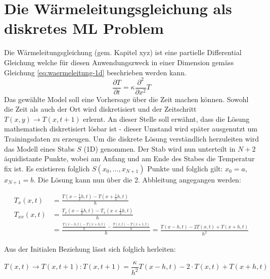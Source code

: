 	\section{Die Wärmeleitungsgleichung als diskretes ML Problem}
	Die Wärmeleitungsgleichung (gem. Kapitel xyz) ist eine partielle Differential Gleichung welche für diesen Anwendungszweck in einer Dimension gemäss Gleichung \ref{eq:waermeleitung-1d} beschrieben werden kann.
	\begin{equation}
	\frac{\partial T}{\partial t} = \kappa \frac{\partial^2}{\partial x^2} T
	\label{eq:waermeleitung-1d}
	\end{equation}
	Das gewählte Model soll eine Vorhersage über die Zeit machen können. Sowohl die Zeit als auch der Ort wird diskretisiert und der Zeitschritt $T(x,y) \rightarrow T(x,t+1)$ erlernt. An dieser Stelle soll erwähnt, dass die Lösung mathematisch diskretisiert lösbar ist - dieser Umstand wird später ausgenutzt um Trainingsdaten zu erzeugen. Um die diskrete Lösung verständlich herzuleiten wird das Modell eines Stabs $S$ (1D) genommen. Der Stab wird nun unterteilt in $N+2$ äquidistante Punkte, wobei am Anfang und am Ende des Stabes die Temperatur fix ist. Es existieren folglich $S(x_0, \dots, x_{N+1})$ Punkte und folglich gilt: $x_0 = a$, $x_{N+1} = b$. Die Lösung kann nun über die 2. Abbleitung angegangen werden:
		
	\begin{align}
	T_{x}(x, t)  &= \frac{T(x-\frac{1}{2}h, t) - T(x+\frac{1}{2}h, t)}{h} \\
	T_{xx}(x, t) &= \frac{T_{x}(x-\frac{1}{2}h, t) - T_{x}(x+\frac{1}{2}h, t)}{h} \\
				 &= \frac{\frac{T(x-h, t) - T(x+h, t)}{h} - \frac{T(x, t) - T(x+1,t)}{h}}{h} = \frac{T(x-h, t) - 2 T(x, t) + T(x+h, t)}{h^{2}}
	\end{align}
	
	Aus der Initialen Beziehung lässt sich folglich herleiten:
	
	\begin{equation}
	T(x,t) \rightarrow T(x,t+1) : T(x,t+1) = \frac{\kappa}{h^{2}} T(x-h,t) - 2 \cdot T(x,t) + T(x+h,t)
	\end{equation}
	
